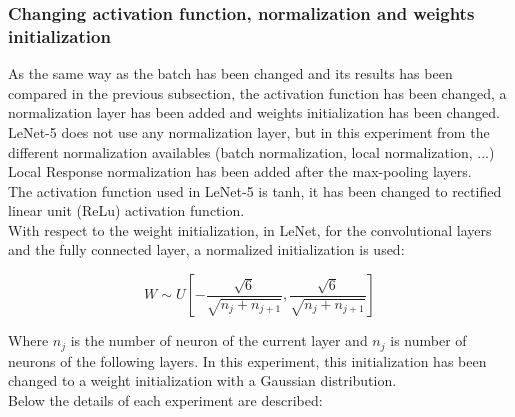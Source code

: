 

\subsubsection{Changing activation function, normalization and weights initialization}
As the same way as the batch has been changed and its results has been compared in the previous subsection, the activation function has been changed, a normalization layer has been added and weights initialization has been changed.\\

LeNet-5 does not use any normalization layer, but in this experiment from the different normalization availables (batch normalization, local normalization, ...) Local Response normalization has been added after the max-pooling layers.\\

The activation function used in LeNet-5 is tanh, it has been changed to rectified linear unit (ReLu) activation function.\\

With respect to the weight initialization, in LeNet, for the convolutional layers and the fully connected layer,  a normalized initialization \cite{XavierInitialization} is used:

\begin{equation}
  W \sim U [- \frac{\sqrt{6}}{\sqrt{n_{j}+n_{j+1}}},\frac{\sqrt{6}}{\sqrt{n_{j}+n_{j+1}}}]
\end{equation}

Where $n_{j}$ is the number of neuron of the current layer and $n_{j}$ is number of neurons of the following layers. In this experiment, this initialization has been changed to a weight initialization with a Gaussian distribution.\\

Below the details of each experiment are described:\\

